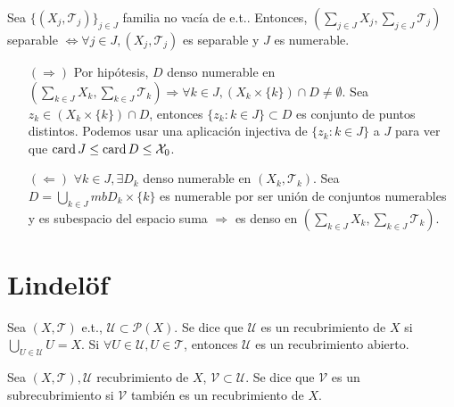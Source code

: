 
\begin{prop}
  Sea $\{ ( X_{j}, \mathcal{T}_{j} ) \}_{j \in J}$ familia no vacía de e.t.. Entonces, $( \sum_{j \in J} X_{j}, \sum_{j \in J} \mathcal{T}_{j})$ separable $ \Leftrightarrow \forall j \in J, ( X_{j}, \mathcal{T}_{j} )$ es separable y $J$ es numerable.
\end{prop}

\begin{dem}
  \begin{enumerate}[label=(\roman*)]
    \item []
    \item [$(\Rightarrow)$]   Por hipótesis, $D$ denso numerable en $( \sum_{k \in J} X_{k}, \sum_{k \in J} \mathcal{T}_{k}) \Rightarrow \forall k \in J, (X_{k} \times \{ k \}) \cap D \neq \emptyset$. Sea $z_{k} \in (X_{k} \times \{ k \}) \cap D$, entonces $\{ z_{k} :  k \in J \} \subset D$ es conjunto de puntos distintos. Podemos usar una aplicación injectiva de $\{ z_{k} :  k \in J \}$ a $ J$ para ver que $\operatorname{card} J \leq \operatorname{card} D \leq \mathcal{X}_{0}$.

    \item [$(\Leftarrow)$] $\forall k \in J, \exists D_{k}$ denso numerable en $( X_{k}, \mathcal{T}_{k} )$. Sea $D = \bigcup_{k \in J}mb D_{k} \times \{ k \}$ es numerable por ser unión de conjuntos numerables y es subespacio del espacio suma $\Rightarrow$ es denso en $( \sum_{k \in J} X_{k}, \sum_{k \in J} \mathcal{T}_{k})$.
  \end{enumerate}
\end{dem}

\section{Lindelöf}

\begin{defn}[Recubrimiento]
  Sea $ ( X, \mathcal{T} )$ e.t., $\mathcal{U} \subset \mathcal{P}(X)$. Se dice que $ \mathcal{U}$ es un recubrimiento de $X$ si $\bigcup_{U \in \mathcal{U}} U = X$. Si $\forall U \in \mathcal{U}, U \in \mathcal{T}$, entonces $\mathcal{U}$ es un recubrimiento abierto.
\end{defn}

\begin{defn}[Subrecubrimiento]
  Sea $( X, \mathcal{T} ), \mathcal{U}$ recubrimiento de $X$, $\mathcal{V} \subset \mathcal{U}$. Se dice que $\mathcal{V}$ es un subrecubrimiento  si $\mathcal{V}$ también es un recubrimiento de $X$.
\end{defn}


